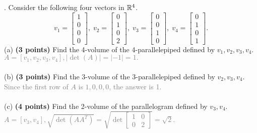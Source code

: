 \documentclass[12pt,a4paper]{article}
\newcommand{\gray}[1]{\textcolor{gray}{#1}}
\renewcommand{\l}{\left}
\renewcommand{\r}{\right}
\newcommand{\ttm}[4]{\l[\begin{array}{cc}{#1}&{#2}\\{#3}&{#4}\end{array}\r]} %
\def\R{\ifmmode\mathbb R\fi}
\begin{document}
\newpage
{}. Consider the following four vectors in $\R^4$.
$$
v_1 = 
\l[
\begin{array}{c}
    1\\ 0\\ 0\\ 0
\end{array}
\r]
, \;
v_2 = 
\l[
\begin{array}{c}
    0\\1\\0\\2
\end{array}
\r]
, \;
v_3 = 
\l[
\begin{array}{c}
    0\\0\\1\\0
\end{array}
\r]
, \;
v_4 = 
\l[
\begin{array}{c}
    0\\1\\0\\1
\end{array}
\r].
$$
(a) \textbf{(3 points) }Find the 4-volume of the 4-parallelepiped defined by $v_1, v_2, v_3, v_4$.\\
\gray{$A = [v_1, v_2, v_3, v_4], |\det(A)| = |-1| = 1.$\\}
\\
(b) \textbf{(3 points) }Find the 3-volume of the 3-parallelepiped defined by $v_2, v_3, v_4$. \\
\gray{Since the first row of $A$ is $1, 0, 0, 0$, the answer is 1. \\}
\\
(c) \textbf{(4 points) }Find the 2-volume of the parallelogram defined by $v_3, v_4$. \\
\gray{$A = [v_3, v_4], \sqrt{\det(AA^T)} = \sqrt{\det\ttm1002} = \sqrt2.$\\}
\end{document}
